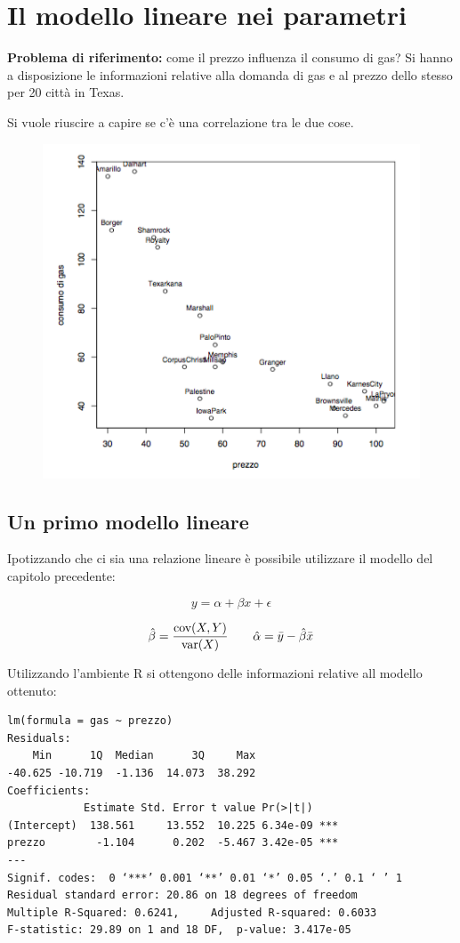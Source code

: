 \chapter{Il modello lineare nei parametri}

\textbf{Problema di riferimento:} come il prezzo influenza il consumo di
gas? Si hanno a disposizione le informazioni relative alla domanda di
gas e al prezzo dello stesso per 20 città in Texas.

Si vuole riuscire a capire se c'è una correlazione tra le due cose.

\begin{figure}[htbp]
	\centering
	\includegraphics[width=.5\textwidth]{./notes/immagini/l7-fig1.png}
\end{figure}

\section{Un primo modello lineare}\label{un-primo-modello-lineare}

Ipotizzando che ci sia una relazione lineare è possibile utilizzare il
modello del capitolo precedente:

$$
y = \alpha + \beta x + \epsilon
$$

$$
\hat{\beta} = \frac{\text{cov}(X,Y)}{\text{var}(X)} \qquad \hat{\alpha} = \bar{y} - \hat{\beta}\bar{x}
$$

Utilizzando l'ambiente R si ottengono delle informazioni relative all
modello ottenuto:

\begin{verbatim}
lm(formula = gas ~ prezzo)
Residuals:
    Min      1Q  Median      3Q     Max
-40.625 -10.719  -1.136  14.073  38.292
Coefficients:
            Estimate Std. Error t value Pr(>|t|)
(Intercept)  138.561     13.552  10.225 6.34e-09 ***
prezzo        -1.104      0.202  -5.467 3.42e-05 ***
---
Signif. codes:  0 ‘***’ 0.001 ‘**’ 0.01 ‘*’ 0.05 ‘.’ 0.1 ‘ ’ 1
Residual standard error: 20.86 on 18 degrees of freedom
Multiple R-Squared: 0.6241,     Adjusted R-squared: 0.6033
F-statistic: 29.89 on 1 and 18 DF,  p-value: 3.417e-05
\end{verbatim}

